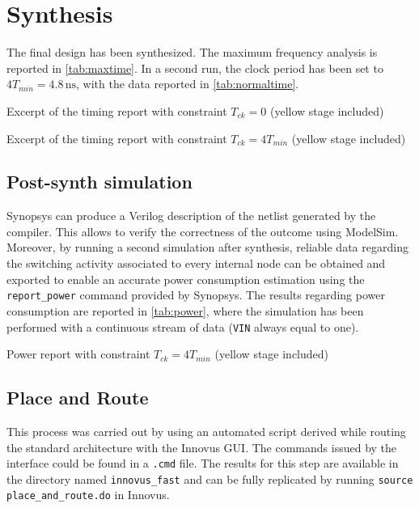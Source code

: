 \section{Synthesis}
The final design has been synthesized. The maximum frequency analysis is reported in \autoref{tab:maxtime}. In a second run, the clock period has been set to $4T_{min} = 4.8\,\textrm{ns}$, with the data reported in \autoref{tab:normaltime}.
\begin{table}
	\parbox[t]{0.53\textwidth}{
	\centering
	
	\caption{Excerpt of the timing report with constraint $T_{ck}=0$ (yellow stage included)}
	\label{tab:maxtime}
	}
\hfill
	\parbox[t]{0.53\textwidth}{
	\centering
	
	\caption{Excerpt of the timing report with constraint $T_{ck}=4T_{min}$ (yellow stage included)}
	\label{tab:normaltime}
}

\end{table}

\subsection{Post-synth simulation}
Synopsys can produce a Verilog description of the netlist generated by the compiler. This allows to verify the correctness of the outcome using ModelSim. Moreover, by running a second simulation after synthesis, reliable data regarding the switching activity associated to every internal node can be obtained and exported to enable an accurate power consumption estimation using the \texttt{report\_power} command provided by Synopsys. The results regarding power consumption are reported in \autoref{tab:power}, where the simulation has been performed with a continuous stream of data (\texttt{VIN} always equal to one). 
\begin{table}
	\centering
	
	\caption{Power report with constraint $T_{ck}=4T_{min}$ (yellow stage included)}
	\label{tab:power}
\end{table}

\subsection{Place and Route} This process was carried out by using an automated script derived while routing the standard architecture with the Innovus GUI. The commands issued by the interface could be found in a \texttt{.cmd} file. The results for this step are available in the directory named \texttt{innovus\_fast} and can be fully replicated by running \texttt{source place\_and\_route.do} in Innovus.
